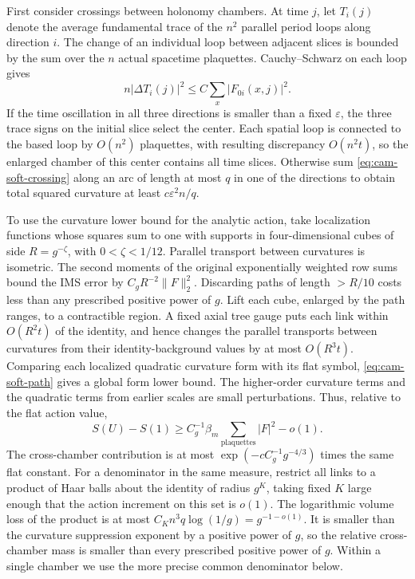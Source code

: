 \documentclass[11pt,a4paper]{article}
\numberwithin{equation}{section}
\begin{document}
First consider crossings between holonomy chambers. At time \(j\), let \(T_i(j)\) denote the average fundamental trace of the \(n^2\) parallel period loops along direction \(i\). The change of an individual loop between adjacent slices is bounded by the sum over the \(n\) actual spacetime plaquettes. Cauchy--Schwarz on each loop gives
\begin{equation}
 n|\Delta T_i(j)|^2\le C\sum_x|F_{0i}(x,j)|^2 .
 \label{eq:cam-soft-crossing}
\end{equation}
If the time oscillation in all three directions is smaller than a fixed \(\varepsilon\), the three trace signs on the initial slice select the center. Each spatial loop is connected to the based loop by \(O(n^2)\) plaquettes, with resulting discrepancy \(O(n^2t)\), so the enlarged chamber of this center contains all time slices. Otherwise sum \eqref{eq:cam-soft-crossing} along an arc of length at most \(q\) in one of the directions to obtain total squared curvature at least \(c\varepsilon^2n/q\).

To use the curvature lower bound for the analytic action, take localization functions whose squares sum to one with supports in four-dimensional cubes of side \(R=g^{-\zeta}\), with \(0<\zeta<1/12\). Parallel transport between curvatures is isometric. The second moments of the original exponentially weighted row sums bound the IMS error by \(C_gR^{-2}\|F\|_2^2\). Discarding paths of length \(>R/10\) costs less than any prescribed positive power of \(g\). Lift each cube, enlarged by the path ranges, to a contractible region. A fixed axial tree gauge puts each link within \(O(R^2t)\) of the identity, and hence changes the parallel transports between curvatures from their identity-background values by at most \(O(R^3t)\). Comparing each localized quadratic curvature form with its flat symbol, \eqref{eq:cam-soft-path} gives a global form lower bound. The higher-order curvature terms and the quadratic terms from earlier scales are small perturbations. Thus, relative to the flat action value,
\[
  S(U)-S(1)\ge C_g^{-1}\beta_m \sum_{\text{plaquettes}}|F|^2-o(1).
\]
The cross-chamber contribution is at most \(\exp(-c C_g^{-1}g^{-4/3})\) times the same flat constant. For a denominator in the same measure, restrict all links to a product of Haar balls about the identity of radius \(g^K\), taking fixed \(K\) large enough that the action increment on this set is \(o(1)\). The logarithmic volume loss of the product is at most \(C_K n^3q\log(1/g)=g^{-1-o(1)}\). It is smaller than the curvature suppression exponent by a positive power of \(g\), so the relative cross-chamber mass is smaller than every prescribed positive power of \(g\). Within a single chamber we use the more precise common denominator below.
\end{document}
